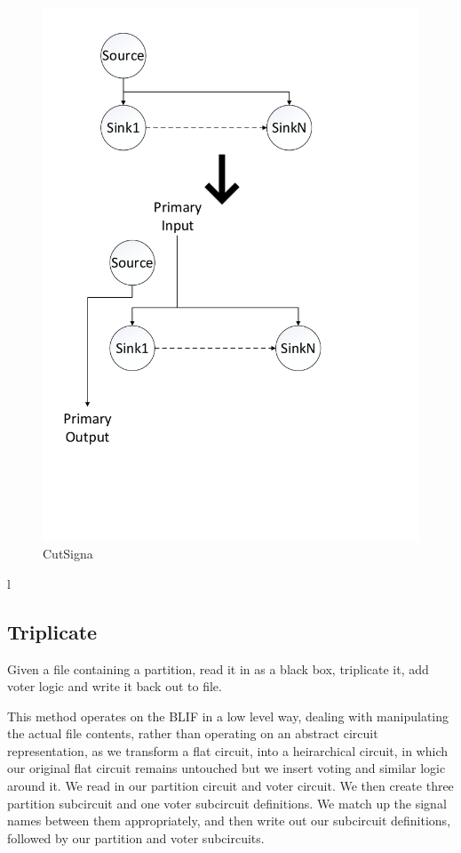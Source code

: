\documentclass[12pt,final,oneside]{dwThesis} %
\begin{document}
   \begin{figure}
      \begin{center}
         \includegraphics[width=\linewidth]{images/CutSignal.pdf}
         \caption{CutSigna}
         \label{imCutSignal}
      \end{center}
   \end{figure}
l
   \newpage
   \subsection{Triplicate}\label{algTriplicate}
   Given a file containing a partition, read it in as a black box, triplicate it, add voter logic and write it back out to file.

   This method operates on the \gls{BLIF} in a low level way, dealing with manipulating the actual file contents, rather than operating on an abstract circuit representation, as we transform a flat circuit, into a heirarchical circuit, in which our original flat circuit remains untouched but we insert voting and similar logic around it.
   We read in our partition circuit and voter circuit. We then create three partition subcircuit and one voter subcircuit definitions. We match up the signal names between them appropriately, and then write out our subcircuit definitions, followed by our partition and voter subcircuits.
\end{document}
